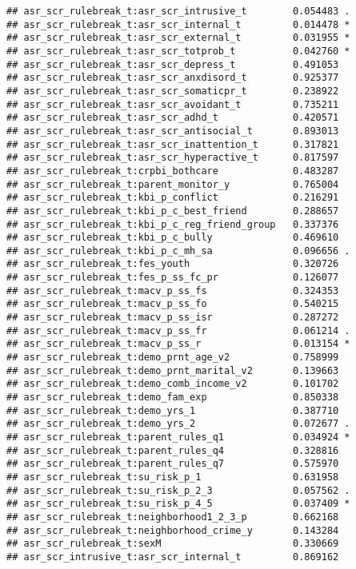 \documentclass[
]{article}
\begin{document}
\begin{verbatim}
## asr_scr_rulebreak_t:asr_scr_intrusive_t        0.054483 .  
## asr_scr_rulebreak_t:asr_scr_internal_t         0.014478 *  
## asr_scr_rulebreak_t:asr_scr_external_t         0.031955 *  
## asr_scr_rulebreak_t:asr_scr_totprob_t          0.042760 *  
## asr_scr_rulebreak_t:asr_scr_depress_t          0.491053    
## asr_scr_rulebreak_t:asr_scr_anxdisord_t        0.925377    
## asr_scr_rulebreak_t:asr_scr_somaticpr_t        0.238922    
## asr_scr_rulebreak_t:asr_scr_avoidant_t         0.735211    
## asr_scr_rulebreak_t:asr_scr_adhd_t             0.420571    
## asr_scr_rulebreak_t:asr_scr_antisocial_t       0.893013    
## asr_scr_rulebreak_t:asr_scr_inattention_t      0.317821    
## asr_scr_rulebreak_t:asr_scr_hyperactive_t      0.817597    
## asr_scr_rulebreak_t:crpbi_bothcare             0.483287    
## asr_scr_rulebreak_t:parent_monitor_y           0.765004    
## asr_scr_rulebreak_t:kbi_p_conflict             0.216291    
## asr_scr_rulebreak_t:kbi_p_c_best_friend        0.288657    
## asr_scr_rulebreak_t:kbi_p_c_reg_friend_group   0.337376    
## asr_scr_rulebreak_t:kbi_p_c_bully              0.469610    
## asr_scr_rulebreak_t:kbi_p_c_mh_sa              0.096656 .  
## asr_scr_rulebreak_t:fes_youth                  0.320726    
## asr_scr_rulebreak_t:fes_p_ss_fc_pr             0.126077    
## asr_scr_rulebreak_t:macv_p_ss_fs               0.324353    
## asr_scr_rulebreak_t:macv_p_ss_fo               0.540215    
## asr_scr_rulebreak_t:macv_p_ss_isr              0.287272    
## asr_scr_rulebreak_t:macv_p_ss_fr               0.061214 .  
## asr_scr_rulebreak_t:macv_p_ss_r                0.013154 *  
## asr_scr_rulebreak_t:demo_prnt_age_v2           0.758999    
## asr_scr_rulebreak_t:demo_prnt_marital_v2       0.139663    
## asr_scr_rulebreak_t:demo_comb_income_v2        0.101702    
## asr_scr_rulebreak_t:demo_fam_exp               0.850338    
## asr_scr_rulebreak_t:demo_yrs_1                 0.387710    
## asr_scr_rulebreak_t:demo_yrs_2                 0.072677 .  
## asr_scr_rulebreak_t:parent_rules_q1            0.034924 *  
## asr_scr_rulebreak_t:parent_rules_q4            0.328816    
## asr_scr_rulebreak_t:parent_rules_q7            0.575970    
## asr_scr_rulebreak_t:su_risk_p_1                0.631958    
## asr_scr_rulebreak_t:su_risk_p_2_3              0.057562 .  
## asr_scr_rulebreak_t:su_risk_p_4_5              0.037409 *  
## asr_scr_rulebreak_t:neighborhood1_2_3_p        0.662168    
## asr_scr_rulebreak_t:neighborhood_crime_y       0.143284    
## asr_scr_rulebreak_t:sexM                       0.330669    
## asr_scr_intrusive_t:asr_scr_internal_t         0.869162    

\end{verbatim}
\end{document}
